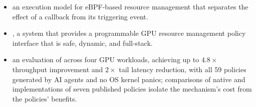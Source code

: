 \begin{itemize}[leftmargin=*,itemsep=0pt]
  \item an execution model for eBPF-based resource management that separates the effect of a callback from its triggering event.
  \item \sys, a system that provides a programmable GPU resource management policy interface that is safe, dynamic, and full-stack.
  \item an evaluation of \sys across four GPU workloads, achieving up to $4.8\times$ throughput improvement and $2\times$ tail latency reduction, with all 59 policies generated by AI agents and no OS kernel panics; comparisons of native and \sys{} implementations of seven published policies isolate the mechanism's cost from the policies' benefits.
\end{itemize}
